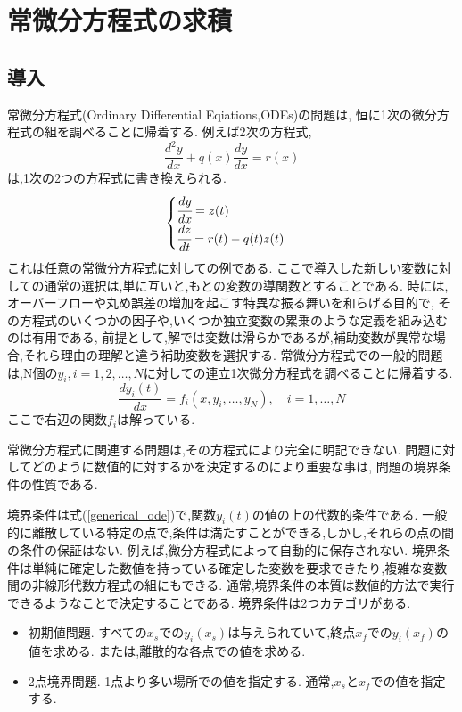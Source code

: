 \chapter{常微分方程式の求積}
\section{導入}
常微分方程式(Ordinary Differential Eqiations,ODEs)の問題は,
恒に1次の微分方程式の組を調べることに帰着する.
例えば2次の方程式,
\begin{equation}
 \frac{d^2 y}{dx} + q(x) \frac{dy}{dx} = r(x)
\end{equation}
は,1次の2つの方程式に書き換えられる.
\begin{eqnarray}
 \begin{cases}
  \cfrac{dy}{dx} = z(t) \\
  \cfrac{dz}{dt} = r(t)-q(t)z(t)
 \end{cases}
\end{eqnarray}
これは任意の常微分方程式に対しての例である.
ここで導入した新しい変数に対しての通常の選択は,単に互いと,もとの変数の導関数とすることである.
時には,オーバーフローや丸め誤差の増加を起こす特異な振る舞いを和らげる目的で,
その方程式のいくつかの因子や,いくつか独立変数の累乗のような定義を組み込むのは有用である,
前提として,解では変数は滑らかであるが,補助変数が異常な場合,それら理由の理解と違う補助変数を選択する.
常微分方程式での一般的問題は,N個の$y_i,i=1,2,\dots,N$に対しての連立1次微分方程式を調べることに帰着する.
\begin{equation}
 \frac{dy_i(t)}{dx} = f_i(x,y_i,\dots,y_N), \quad i=1,\dots,N \label{generical_ode}
\end{equation}
ここで右辺の関数$f_i$は解っている.

常微分方程式に関連する問題は,その方程式により完全に明記できない.
問題に対してどのように数値的に対するかを決定するのにより重要な事は,
問題の境界条件の性質である.

境界条件は式(\ref{generical_ode})で,関数$y_i(t)$の値の上の代数的条件である.
一般的に離散している特定の点で,条件は満たすことができる,しかし,それらの点の間の条件の保証はない.
例えば,微分方程式によって自動的に保存されない.
境界条件は単純に確定した数値を持っている確定した変数を要求できたり,複雑な変数間の非線形代数方程式の組にもできる.
通常,境界条件の本質は数値的方法で実行できるようなことで決定することである.
境界条件は2つカテゴリがある.
\begin{itemize}
 \item 初期値問題. すべての$x_s$での$y_i(x_s)$は与えられていて,終点$x_f$での$y_i(x_f)$の値を求める.
	   または,離散的な各点での値を求める.
 \item 2点境界問題. 1点より多い場所での値を指定する. 通常,$x_s$と$x_f$での値を指定する.
\end{itemize}